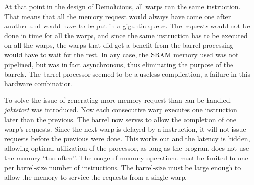 \documentclass[../main/report.tex]{subfiles}
\begin{document}
At that point in the design of Demolicious, all warps ran the same instruction.
That means that all the memory request would always have come one after another and would have to be put in a gigantic queue.
The requests would not be done in time for all the warps, and since the same instruction has to be executed on all the warps, the warps that did get a benefit from the barrel processing would have to wait for the rest.
In any case, the SRAM memory used was not pipelined, but was in fact asynchronous, thus eliminating the purpose of the barrels.
The barrel processor seemed to be a useless complication, a failure in this hardware combination.

To solve the issue of generating more memory request than can be handled, \emph{jaktstart} was introduced.
Now each consecutive warp executes one instruction later than the previous.
The barrel now serves to allow the completion of one warp's requests.
Since the next warp is delayed by a instruction, it will not issue requests before the previous were done.
This works out and the latency is hidden, allowing optimal utilization of the processor, as long as the program does not use the memory ``too often''.
The usage of memory operations must be limited to one per barrel-size number of instructions.
The barrel-size must be large enough to allow the memory to service the requests from a single warp.
\end{document}
